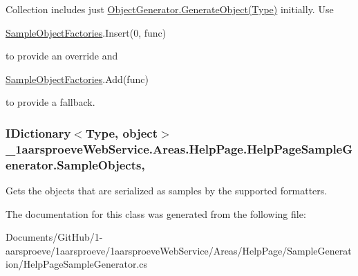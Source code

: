 Collection includes just \hyperlink{class__1aarsproeve_web_service_1_1_areas_1_1_help_page_1_1_object_generator_ad47fd6b8894401475144cf522d8767d0}{Object\+Generator.\+Generate\+Object(\+Type)} initially. Use 
\begin{DoxyCode}
\hyperlink{class__1aarsproeve_web_service_1_1_areas_1_1_help_page_1_1_help_page_sample_generator_a29295b515e45cebc44d8a111e9dd3d01}{SampleObjectFactories}.Insert(0, func)
\end{DoxyCode}
 to provide an override and 
\begin{DoxyCode}
\hyperlink{class__1aarsproeve_web_service_1_1_areas_1_1_help_page_1_1_help_page_sample_generator_a29295b515e45cebc44d8a111e9dd3d01}{SampleObjectFactories}.Add(func)
\end{DoxyCode}
 to provide a fallback.\hypertarget{class__1aarsproeve_web_service_1_1_areas_1_1_help_page_1_1_help_page_sample_generator_aa9621fc1bc0621b656579d3967528dcc}{}
\subsubsection[{Sample\+Objects}]{\setlength{\rightskip}{0pt plus 5cm}I\+Dictionary$<$Type, object$>$ \+\_\+1aarsproeve\+Web\+Service.\+Areas.\+Help\+Page.\+Help\+Page\+Sample\+Generator.\+Sample\+Objects\hspace{0.3cm}{\ttfamily [get]}, {\ttfamily [set]}}\label{class__1aarsproeve_web_service_1_1_areas_1_1_help_page_1_1_help_page_sample_generator_aa9621fc1bc0621b656579d3967528dcc}


Gets the objects that are serialized as samples by the supported formatters. 



The documentation for this class was generated from the following file\+:\begin{DoxyCompactItemize}
\item 
Documents/\+Git\+Hub/1-\/aarsproeve/1aarsproeve/1aarsproeve\+Web\+Service/\+Areas/\+Help\+Page/\+Sample\+Generation/Help\+Page\+Sample\+Generator.\+cs\end{DoxyCompactItemize}
